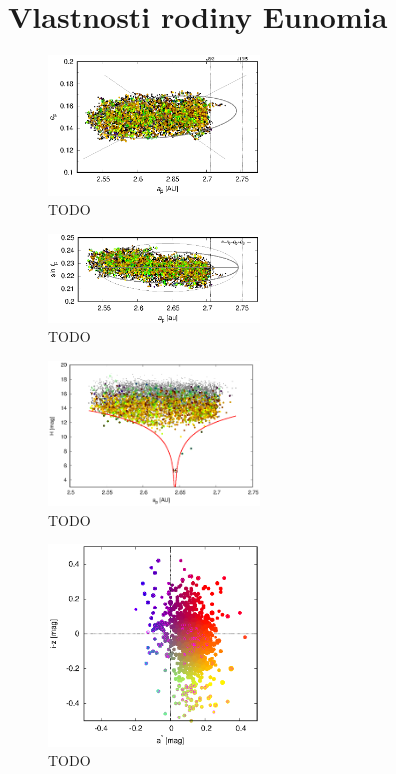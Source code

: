 \documentclass[A4paper, 12pt, oneside]{book}
\begin{document}
\chapter{Vlastnosti rodiny Eunomia}
\begin{figure}
	\centering
	\includegraphics[width=0.5\textwidth]{obr/ae_wise}
	\caption{TODO}
	\label{ae_wise}
\end{figure}
\begin{figure}
	\centering
	\includegraphics[width=0.5\textwidth]{obr/ai_wise}
	\caption{TODO}
	\label{ai_wise}
\end{figure}
\begin{figure}
	\centering
	\includegraphics[width=0.5\textwidth]{obr/aH_wise}
	\caption{TODO}
	\label{aH_wise}
\end{figure}
\begin{figure}
	\centering
	\includegraphics[width=0.5\textwidth]{obr/astar_iz}
	\caption{TODO}
	\label{astar_iz}
\end{figure}
\end{document}
